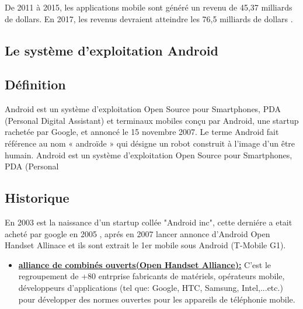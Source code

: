 \documentclass[french,a4,12pt]{report}
\begin{document}
	\textsf{De 2011 à 2015, les applications mobile sont généré un revenu de 45,37 milliards de dollars. En 2017, les revenus devraient atteindre
	les 76,5 milliards de dollars \cite{4}. }



\begin{tcolorbox}[leftrule=3mm]
\section{Le système d'exploitation Android}
\end{tcolorbox}

\begin{tcolorbox}[colframe=green!75,rightrule=0.5cm,leftrule=0.5cm,]
\subsection{Définition}
\end{tcolorbox}
Android est un système d’exploitation Open Source pour Smartphones, PDA (Personal Digital Assistant) et terminaux mobiles conçu par Android, une startup rachetée par Google, et annoncé le 15 novembre 2007. Le terme Android fait référence au nom « androïde » qui désigne un robot construit à l’image d’un être humain.
Android est un système d’exploitation Open Source pour Smartphones, PDA (Personal 
\begin{tcolorbox}[colframe=green!75,rightrule=0.5cm,leftrule=0.5cm,]
	\subsection{Historique}
\end{tcolorbox}
\textsf{En 2003 est la naissance d'un startup collée "Android inc", cette derniére a etait acheté par google en 2005 , aprés en 2007 lancer  annonce d'Android  Open Handset Allinace et ils sont extrait le 1er mobile sous Android (T-Mobile G1).}\\


\begin{itemize}%
\item{ \underline{ \textbf{alliance de combinés ouverts(Open Handset Alliance):}}}
\textsf{C'est le regroupement de +80 entrprise fabricants de matériels, opérateurs mobile, développeurs d'applications (tel que: Google, HTC, Samsung, Intel,...etc.) pour développer  des normes ouvertes pour les appareils de téléphonie mobile.}\\
\end{itemize}
\end{document}
